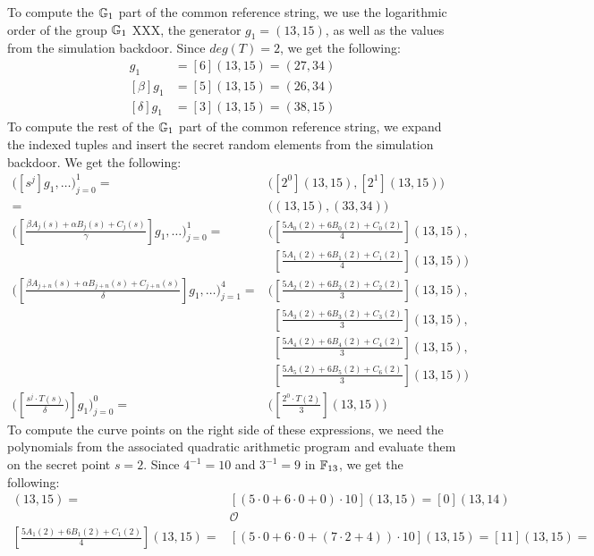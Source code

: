 \begin{example}
To compute the $\mathbb{G}_1$ part of the common reference string, we use the logarithmic order of the group $\mathbb{G}_1$ XXX, the generator $g_1=(13,15)$, as well as the values from the simulation backdoor. Since $deg(T)=2$, we get the following:
\begin{align*}
[\alpha]g_1 & = [6](13,15) = (27,34) \\
[\beta]g_1 & = [5](13,15) = (26,34) \\
[\delta]g_1 & = [3](13,15) = (38,15)
\end{align*}
To compute the rest of the $\mathbb{G}_1$ part of the common reference string, we expand the indexed tuples and insert the secret random elements from the simulation backdoor. We get the following:
\begin{align*}
\Big( [s^{j}]g_1,\ldots\Big) _{j=0}^{1} = 
 & \Big( [2^0](13,15), [2^1](13,15)\Big)  \\
 = & \Big((13,15),(33,34)\Big)\\
\Big([\frac{\beta A_{j}(s)+ \alpha B_{j}(s) + C_{j}(s)}{\gamma}]g_1,\ldots\Big)_{j=0}^1 =
 & \Big([\frac{5 A_{0}(2)+6 B_{0}(2)+C_{0}(2)}{4}](13,15),\\
 &\phantom{\Big(} [\frac{5 A_{1}(2)+6 B_{1}(2)+C_{1}(2)}{4}](13,15)\Big)\\
\Big([\frac{\beta A_{j+n}(s)+ \alpha B_{j+n}(s) + C_{j+n}(s)}{\delta}]g_1,\ldots\Big)_{j=1}^4 = 
&  \Big( [\frac{5 A_{2}(2)+ 6 B_{2}(2) + C_{2}(2)}{3}](13,15),\\ 
& \phantom{\Big(} [\frac{5 A_{3}(2)+ 6 B_{3}(2) + C_{3}(2)}{3}](13,15),\\
& \phantom{\Big(} [\frac{5 A_{4}(2)+ 6 B_{4}(2) + C_{4}(2)}{3}](13,15),\\ 
& \phantom{\Big(} [\frac{5 A_{5}(2)+ 6 B_{5}(2) + C_{6}(2)}{3}](13,15)\Big)\\
\Big([\frac{s^j\cdot T(s)}{\delta})]g_1\Big)_{j=0}^0 = & \Big([\frac{2^0\cdot T(2)}{3}](13,15)\Big) 
\end{align*}
To compute the curve points on the right side of these expressions, we need the polynomials from the associated quadratic arithmetic program and evaluate them on the secret point $s=2$. Since $4^{-1}=10$ and $3^{-1}=9$ in $\mathbb{F}_{13}$, we get the following:
\begin{align*}
[\frac{5 A_{0}(2)+6 B_{0}(2)+C_{0}(2)}{4}](13,15) = 
 & [(5 \cdot 0 +6\cdot 0 + 0)\cdot 10](13,15) = [0](13,14)\\
 & \mathcal{O} \\
[\frac{5 A_{1}(2)+6 B_{1}(2)+C_{1}(2)}{4}](13,15) = 
 & [(5\cdot 0 +6\cdot 0 + (7\cdot 2 + 4))\cdot 10](13,15) = [11](13,15) = \\

\end{align*}
\end{example}
